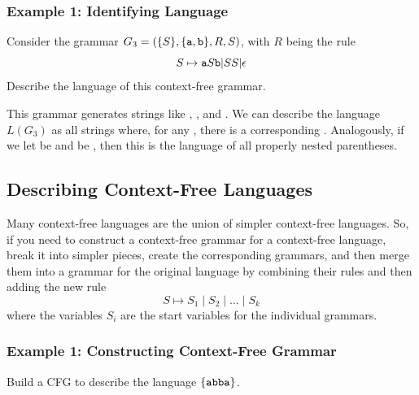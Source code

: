 \documentclass[letterpaper]{article}
\begin{document}
\subsubsection{Example 1: Identifying Language}
Consider the grammar $G_3 = (\{S\}, \{\texttt{a}, \texttt{b}\}, R, S)$, with $R$ being the rule 
\[S \mapsto \texttt{a}S\texttt{b} | SS | \epsilon\]
Describe the language of this context-free grammar. 

\begin{mdframed}[]
    This grammar generates strings like , , and . We can describe the language $L(G_3)$ as all strings where, for any , there is a corresponding . Analogously, if we let  be \code{(} and  be \code{)}, then this is the language of all properly nested parentheses. 
\end{mdframed}

\subsection{Describing Context-Free Languages}
Many context-free languages are the union of simpler context-free languages. So, if you need to construct a context-free grammar for a context-free language, break it into simpler pieces, create the corresponding grammars, and then merge them into a grammar for the original language by combining their rules and then adding the new rule 
    \[S \mapsto S_1 \mid S_2 \mid \dots \mid S_k\]
where the variables $S_i$ are the start variables for the individual grammars. 

\subsubsection{Example 1: Constructing Context-Free Grammar}
Build a CFG to describe the language $\{\texttt{abba}\}$. 
\end{document}
